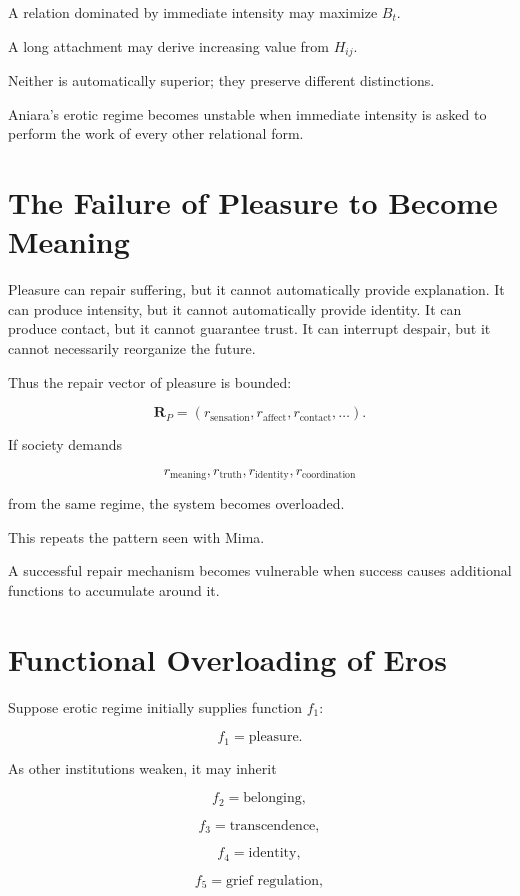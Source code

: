 \documentclass[11pt,oneside]{book}
\theoremstyle{definition}
\theoremstyle{remark}
\begin{document}
A relation dominated by immediate intensity may maximize \(B_t\).

A long attachment may derive increasing value from \(H_{ij}\).

Neither is automatically superior; they preserve different distinctions.

Aniara's erotic regime becomes unstable when immediate intensity is asked to perform the work of every other relational form.

\section{The Failure of Pleasure to Become Meaning}

Pleasure can repair suffering, but it cannot automatically provide explanation. It can produce intensity, but it cannot automatically provide identity. It can produce contact, but it cannot guarantee trust. It can interrupt despair, but it cannot necessarily reorganize the future.

Thus the repair vector of pleasure is bounded:

\[
\mathbf R_P
=
(
r_{\mathrm{sensation}},
r_{\mathrm{affect}},
r_{\mathrm{contact}},
\ldots
).
\]

If society demands

\[
r_{\mathrm{meaning}},
r_{\mathrm{truth}},
r_{\mathrm{identity}},
r_{\mathrm{coordination}}
\]

from the same regime, the system becomes overloaded.

This repeats the pattern seen with Mima.

A successful repair mechanism becomes vulnerable when success causes additional functions to accumulate around it.

\section{Functional Overloading of Eros}

Suppose erotic regime initially supplies function \(f_1\):

\[
f_1=\text{pleasure}.
\]

As other institutions weaken, it may inherit

\[
f_2=\text{belonging},
\]

\[
f_3=\text{transcendence},
\]

\[
f_4=\text{identity},
\]

\[
f_5=\text{grief regulation},
\]
\end{document}

